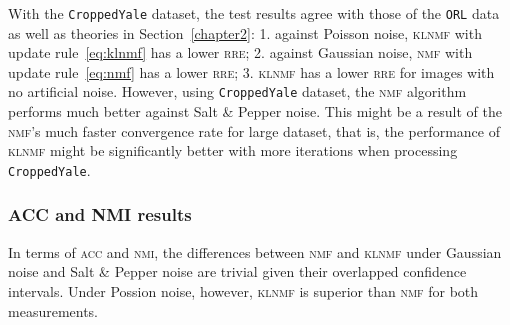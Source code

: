With the \texttt{CroppedYale} dataset, the test results agree with those of the \texttt{ORL} data as well as theories in Section~\ref{chapter2}: 1. against Poisson noise, \textsc{klnmf} with update rule~\eqref{eq:klnmf} has a lower \textsc{rre}; 2. against Gaussian noise, \textsc{nmf} with update rule~\eqref{eq:nmf} has a lower \textsc{rre}; 3. \textsc{klnmf} has a lower \textsc{rre} for images with no artificial noise. However, using \texttt{CroppedYale} dataset, the \textsc{nmf} algorithm performs much better against Salt \& Pepper noise. This might be a result of the \textsc{nmf}'s much faster convergence rate for large dataset, that is, the performance of \textsc{klnmf} might be significantly better with more iterations when processing \texttt{CroppedYale}.

\subsubsection{ACC and NMI results}
In terms of \textsc{acc} and \textsc{nmi}, the differences between \textsc{nmf} and \textsc{klnmf} under Gaussian noise and Salt \& Pepper noise are trivial given their overlapped confidence intervals. Under Possion noise, however, \textsc{klnmf} is superior than \textsc{nmf} for both measurements. 


